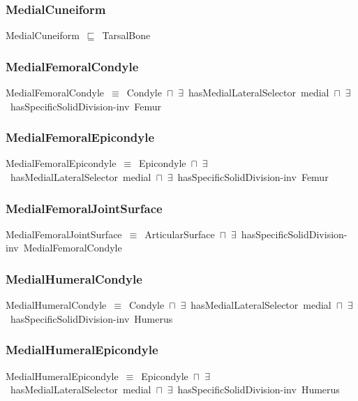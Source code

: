 \documentclass{article}
\begin{document}
\subsubsection*{MedialCuneiform}

MedialCuneiform~\ensuremath{\sqsubseteq}~TarsalBone~

\subsubsection*{MedialFemoralCondyle}

MedialFemoralCondyle~\ensuremath{\equiv}~Condyle~\ensuremath{\sqcap}~\ensuremath{\exists}~hasMedialLateralSelector~medial~\ensuremath{\sqcap}~\ensuremath{\exists}~hasSpecificSolidDivision-inv~Femur

\subsubsection*{MedialFemoralEpicondyle}

MedialFemoralEpicondyle~\ensuremath{\equiv}~Epicondyle~\ensuremath{\sqcap}~\ensuremath{\exists}~hasMedialLateralSelector~medial~\ensuremath{\sqcap}~\ensuremath{\exists}~hasSpecificSolidDivision-inv~Femur

\subsubsection*{MedialFemoralJointSurface}

MedialFemoralJointSurface~\ensuremath{\equiv}~ArticularSurface~\ensuremath{\sqcap}~\ensuremath{\exists}~hasSpecificSolidDivision-inv~MedialFemoralCondyle

\subsubsection*{MedialHumeralCondyle}

MedialHumeralCondyle~\ensuremath{\equiv}~Condyle~\ensuremath{\sqcap}~\ensuremath{\exists}~hasMedialLateralSelector~medial~\ensuremath{\sqcap}~\ensuremath{\exists}~hasSpecificSolidDivision-inv~Humerus

\subsubsection*{MedialHumeralEpicondyle}

MedialHumeralEpicondyle~\ensuremath{\equiv}~Epicondyle~\ensuremath{\sqcap}~\ensuremath{\exists}~hasMedialLateralSelector~medial~\ensuremath{\sqcap}~\ensuremath{\exists}~hasSpecificSolidDivision-inv~Humerus
\end{document}
